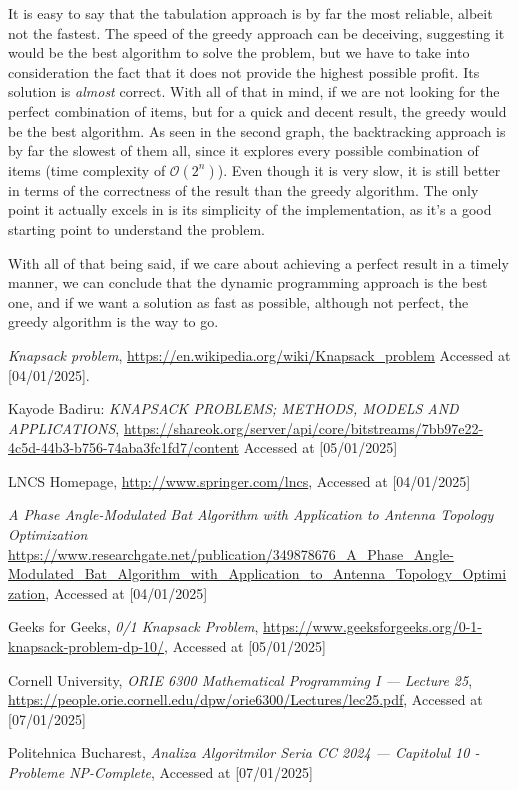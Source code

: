 \documentclass{llncs}
\begin{document}
It is easy to say that the tabulation approach is by far the most reliable, albeit
not the fastest. The speed of the greedy approach can be deceiving, suggesting it would be
the best algorithm to solve the problem, but we have to take into consideration the fact
that it does not provide the highest possible profit. Its solution is \textit{almost} correct.
With all of that in mind, if we are not looking for the perfect combination of items, but
for a quick and decent result, the greedy would be the best algorithm. As seen in the second graph,
the backtracking approach is by far the slowest of them all, since it explores every possible combination of items
(time complexity of $\mathcal{O}(2^n)$). Even though it is very slow, it is still better in terms of
the correctness of the result than the greedy algorithm. The only point it actually excels in
is its simplicity of the implementation, as it's a good starting point to understand the problem.

With all of that being said, if we care about achieving a perfect result in a timely manner,
we can conclude that the dynamic programming approach is the best one, and if we want a
solution as fast as possible, although not perfect, the greedy algorithm is the way to go.
%
%
%
% 
% 
%
\begin{thebibliography}{8}

\emph{Knapsack problem}, \url{https://en.wikipedia.org/wiki/Knapsack_problem} Accessed at [04/01/2025].

Kayode Badiru: \emph{KNAPSACK PROBLEMS; METHODS, MODELS AND APPLICATIONS},
\url{https://shareok.org/server/api/core/bitstreams/7bb97e22-4c5d-44b3-b756-74aba3fc1fd7/content} 
Accessed at [05/01/2025]

LNCS Homepage, \url{http://www.springer.com/lncs}, Accessed at [04/01/2025]

\emph{A Phase Angle-Modulated Bat Algorithm with Application to Antenna Topology Optimization}
\url{https://www.researchgate.net/publication/349878676_A_Phase_Angle-Modulated_Bat_Algorithm_with_Application_to_Antenna_Topology_Optimization}, Accessed at [04/01/2025]

Geeks for Geeks, \emph{0/1 Knapsack Problem}, \url{https://www.geeksforgeeks.org/0-1-knapsack-problem-dp-10/}, Accessed at [05/01/2025]

Cornell University, \emph{ORIE 6300 Mathematical Programming I --- Lecture 25}, \url{https://people.orie.cornell.edu/dpw/orie6300/Lectures/lec25.pdf}, Accessed at [07/01/2025]

Politehnica Bucharest, \emph{Analiza Algoritmilor Seria CC 2024 --- Capitolul 10 - Probleme NP-Complete}, Accessed at [07/01/2025]

\end{thebibliography}
\end{document}
